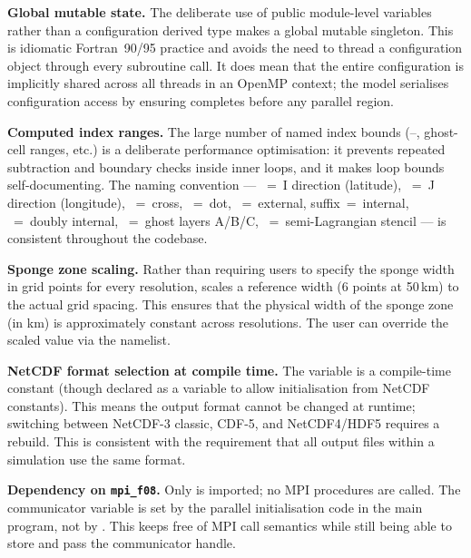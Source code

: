 \textbf{Global mutable state.} The deliberate use of public module-level
variables rather than a configuration derived type makes 
a global mutable singleton. This is idiomatic Fortran~90/95 practice and
avoids the need to thread a configuration object through every subroutine
call. It does mean that the entire configuration is implicitly shared across
all threads in an OpenMP context; the model serialises configuration
access by ensuring  completes before any parallel region.

\textbf{Computed index ranges.} The large number of named index bounds
(--, ghost-cell ranges, etc.) is a deliberate
performance optimisation: it prevents repeated subtraction and boundary
checks inside inner loops, and it makes loop bounds self-documenting.
The naming convention --- ~=~I direction (latitude), ~=~J
direction (longitude), ~=~cross, ~=~dot, ~=~external,
 suffix~=~internal, ~=~doubly internal, ~=~ghost
layers A/B/C, ~=~semi-Lagrangian stencil --- is consistent
throughout the codebase.

\textbf{Sponge zone scaling.} Rather than requiring users to specify the
sponge width in grid points for every resolution,  scales
a reference width (6 points at 50\,km) to the actual grid spacing. This
ensures that the physical width of the sponge zone (in km) is approximately
constant across resolutions. The user can override the scaled value via the
 namelist.

\textbf{NetCDF format selection at compile time.} The  variable
is a compile-time constant (though declared as a variable to allow
initialisation from NetCDF constants). This means the output format cannot
be changed at runtime; switching between NetCDF-3 classic, CDF-5, and
NetCDF4/HDF5 requires a rebuild. This is consistent with the requirement that
all output files within a simulation use the same format.

\textbf{Dependency on \texttt{mpi\_f08}.} Only  is
imported; no MPI procedures are called. The communicator variable
 is set by the parallel initialisation code in the main program,
not by . This keeps  free of MPI
call semantics while still being able to store and pass the communicator
handle.

